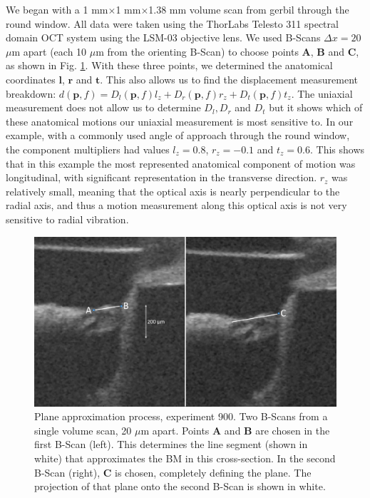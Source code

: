 \documentclass[preprint,NumberedRefs]{JASA}
\begin{document}
\par{We began with a 1 mm$\times$1 mm$\times$1.38 mm volume scan from gerbil through the round window. All data were taken using the ThorLabs Telesto 311 spectral domain OCT system using the LSM-03 objective lens. We used B-Scans $\Delta x = 20$ $\mu$m apart (each 10 $\mu$m from the orienting B-Scan) to choose points $\mathbf{A}$, $\mathbf{B}$ and $\mathbf{C}$, as shown in Fig. \ref{lines}. With these three points, we determined the anatomical coordinates $\mathbf{l}$, $\mathbf{r}$ and $\mathbf{t}$. This also allows us to find the displacement measurement breakdown: $d(\mathbf{p},f) = D_l(\mathbf{p},f)l_z + D_r(\mathbf{p},f)r_z + D_t(\mathbf{p},f)t_z.$ The uniaxial measurement does not allow us to determine $D_l, D_r$ and $D_t$ but it shows which of these anatomical motions our uniaxial measurement is most sensitive to. In our example, with a commonly used angle of approach through the round window, the component multipliers had values $l_z = 0.8$, $r_z = -0.1$ and $t_z = 0.6$. This shows that in this example the most represented anatomical component of motion was longitudinal, with significant representation in the transverse direction. $r_z$ was relatively small, meaning that the optical axis is nearly perpendicular to the radial axis, and thus a motion measurement along this optical axis is not very sensitive to radial vibration.}

\begin{figure}[h!]
\centering
\includegraphics[width=\textwidth]{Figure5.pdf}
\caption{Plane approximation process, experiment 900. Two B-Scans from a single volume scan, 20 $\mu$m apart. Points $\mathbf{A}$ and $\mathbf{B}$ are chosen in the first B-Scan (left). This determines the line segment (shown in white) that approximates the BM in this cross-section. In the second B-Scan (right), $\mathbf{C}$ is chosen, completely defining the plane. The projection of that plane onto the second B-Scan is shown in white.}
\label{lines}
\end{figure}
\end{document}

